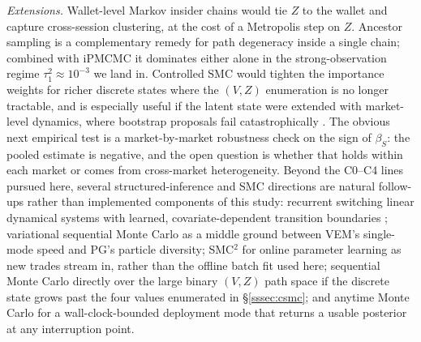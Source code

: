 \emph{Extensions.} Wallet-level Markov insider chains would tie $Z$ to the wallet and capture cross-session clustering, at the cost of a Metropolis step on $Z$. Ancestor sampling \citep{lindsten2014particle} is a complementary remedy for path degeneracy inside a single chain; combined with iPMCMC it dominates either alone in the strong-observation regime $\tau^2_1 \approx 10^{-3}$ we land in. Controlled SMC \citep{heng2020controlled} would tighten the importance weights for richer discrete states where the $(V,Z)$ enumeration is no longer tractable, and is especially useful if the latent state were extended with market-level dynamics, where bootstrap proposals fail catastrophically \citep{bickel2008sharp}. The obvious next empirical test is a market-by-market robustness check on the sign of $\beta_S$: the pooled estimate is negative, and the open question is whether that holds within each market or comes from cross-market heterogeneity. Beyond the C0--C4 lines pursued here, several structured-inference and SMC directions are natural follow-ups rather than implemented components of this study: recurrent switching linear dynamical systems with learned, covariate-dependent transition boundaries \citep{linderman2017rslds}; variational sequential Monte Carlo \citep{naesseth2018vsmc} as a middle ground between VEM's single-mode speed and PG's particle diversity; SMC$^2$ \citep{chopin2013smc2} for online parameter learning as new trades stream in, rather than the offline batch fit used here; sequential Monte Carlo directly over the large binary $(V,Z)$ path space \citep{schafer2013binarysmc} if the discrete state grows past the four values enumerated in \S\ref{sssec:csmc}; and anytime Monte Carlo \citep{murray2016anytime} for a wall-clock-bounded deployment mode that returns a usable posterior at any interruption point.
